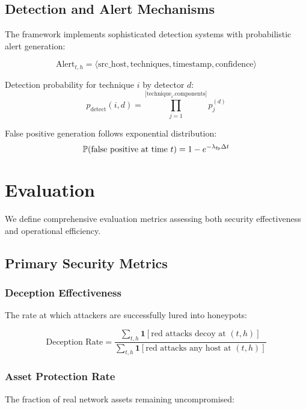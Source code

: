\documentclass[11pt]{article}
\theoremstyle{definition}
\theoremstyle{plain}
\begin{document}
\subsection{Detection and Alert Mechanisms}

The framework implements sophisticated detection systems with probabilistic alert generation:

\begin{equation}
\text{Alert}_{t,h} = \langle \text{src\_host}, \text{techniques}, \text{timestamp}, \text{confidence} \rangle
\end{equation}

Detection probability for technique $i$ by detector $d$:
\begin{equation}
p_{\text{detect}}(i, d) = \prod_{j=1}^{|\text{technique}_i.\text{components}|} p_j^{(d)}
\end{equation}

False positive generation follows exponential distribution:
\begin{equation}
\mathbb{P}(\text{false positive at time } t) = 1 - e^{-\lambda_{\text{fp}} \Delta t}
\end{equation}

\section{Evaluation}

We define comprehensive evaluation metrics assessing both security effectiveness and operational efficiency.

\subsection{Primary Security Metrics}

\subsubsection{Deception Effectiveness}
The rate at which attackers are successfully lured into honeypots:

\begin{equation}
\text{Deception Rate} = \frac{\sum_{t,h} \mathbf{1}[\text{red attacks decoy at } (t,h)]}{\sum_{t,h} \mathbf{1}[\text{red attacks any host at } (t,h)]}
\end{equation}

\subsubsection{Asset Protection Rate}
The fraction of real network assets remaining uncompromised:
\end{document}
